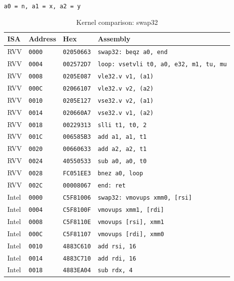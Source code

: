 \begin{table}[htbp]
\centering
\caption{Kernel comparison: swap32}
\begingroup
\scriptsize
\setlength{\tabcolsep}{4pt}
\noindent \texttt{a0 = n, a1 = x, a2 = y}\par
\vspace{0.6ex}
\begin{tabular}{@{}l|l|l|p{7.2cm}@{}}
\toprule
ISA & Address & Hex & Assembly \\
\midrule
RVV & \texttt{0000} & \texttt{02050663} & \texttt{swap32: beqz a0, end} \\
RVV & \texttt{0004} & \texttt{002572D7} & \texttt{loop: vsetvli t0, a0, e32, m1, tu, mu} \\
RVV & \texttt{0008} & \texttt{0205E087} & \texttt{vle32.v v1, (a1)} \\
RVV & \texttt{000C} & \texttt{02066107} & \texttt{vle32.v v2, (a2)} \\
RVV & \texttt{0010} & \texttt{0205E127} & \texttt{vse32.v v2, (a1)} \\
RVV & \texttt{0014} & \texttt{020660A7} & \texttt{vse32.v v1, (a2)} \\
RVV & \texttt{0018} & \texttt{00229313} & \texttt{slli t1, t0, 2} \\
RVV & \texttt{001C} & \texttt{006585B3} & \texttt{add a1, a1, t1} \\
RVV & \texttt{0020} & \texttt{00660633} & \texttt{add a2, a2, t1} \\
RVV & \texttt{0024} & \texttt{40550533} & \texttt{sub a0, a0, t0} \\
RVV & \texttt{0028} & \texttt{FC051EE3} & \texttt{bnez a0, loop} \\
RVV & \texttt{002C} & \texttt{00008067} & \texttt{end: ret} \\
\midrule
Intel & \texttt{0000} & \texttt{C5F81006} & \texttt{swap32: vmovups xmm0, [rsi]} \\
Intel & \texttt{0004} & \texttt{C5F8100F} & \texttt{vmovups xmm1, [rdi]} \\
Intel & \texttt{0008} & \texttt{C5F8110E} & \texttt{vmovups [rsi], xmm1} \\
Intel & \texttt{000C} & \texttt{C5F81107} & \texttt{vmovups [rdi], xmm0} \\
Intel & \texttt{0010} & \texttt{4883C610} & \texttt{add rsi, 16} \\
Intel & \texttt{0014} & \texttt{4883C710} & \texttt{add rdi, 16} \\
Intel & \texttt{0018} & \texttt{4883EA04} & \texttt{sub rdx, 4} \\

\end{tabular}
\end{table}
